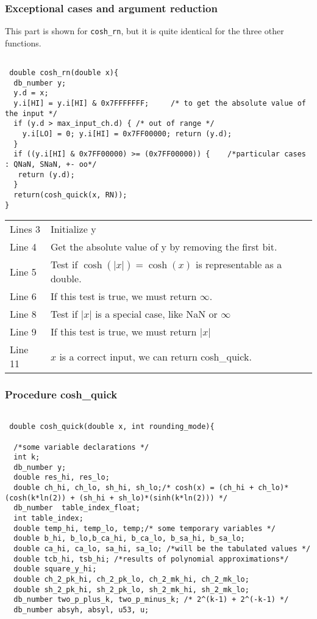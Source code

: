 \subsubsection{Exceptional cases and argument reduction}

This part  is shown for \texttt{cosh\_rn}, but it is quite identical for the three other functions.

\begin{lstlisting}[caption={Exceptional cases},firstnumber=1]

 double cosh_rn(double x){ 
  db_number y;
  y.d = x;
  y.i[HI] = y.i[HI] & 0x7FFFFFFF;     /* to get the absolute value of the input */
  if (y.d > max_input_ch.d) { /* out of range */
    y.i[LO] = 0; y.i[HI] = 0x7FF00000; return (y.d);
  }
  if ((y.i[HI] & 0x7FF00000) >= (0x7FF00000)) {    /*particular cases : QNaN, SNaN, +- oo*/
   return (y.d);
  }
  return(cosh_quick(x, RN));
}
\end{lstlisting}

\begin{tabular}{ll}
Lines  3 &  Initialize y\\
Line 4 & Get the absolute value of y by removing the first bit.\\
Line 5 & Test if $\cosh(|x|) = \cosh(x)$ is representable as a double.\\
Line 6 & If this test is true, we must return $\infty$.\\
Line 8 & Test if $|x|$ is a special case, like NaN or $\infty$\\
Line 9 & If this test is true, we must return $|x|$ \\
Line 11 & $x$ is a correct input, we can return cosh\_quick. \\
\end{tabular}



\subsubsection{Procedure cosh\_quick}

\begin{lstlisting}[caption={Procedure \texttt{cosh\_quick} - variables},firstnumber=1]

 double cosh_quick(double x, int rounding_mode){

  /*some variable declarations */
  int k;
  db_number y;
  double res_hi, res_lo;
  double ch_hi, ch_lo, sh_hi, sh_lo;/* cosh(x) = (ch_hi + ch_lo)*(cosh(k*ln(2)) + (sh_hi + sh_lo)*(sinh(k*ln(2))) */
  db_number  table_index_float;
  int table_index;
  double temp_hi, temp_lo, temp;/* some temporary variables */
  double b_hi, b_lo,b_ca_hi, b_ca_lo, b_sa_hi, b_sa_lo;
  double ca_hi, ca_lo, sa_hi, sa_lo; /*will be the tabulated values */
  double tcb_hi, tsb_hi; /*results of polynomial approximations*/
  double square_y_hi;
  double ch_2_pk_hi, ch_2_pk_lo, ch_2_mk_hi, ch_2_mk_lo;
  double sh_2_pk_hi, sh_2_pk_lo, sh_2_mk_hi, sh_2_mk_lo;
  db_number two_p_plus_k, two_p_minus_k; /* 2^(k-1) + 2^(-k-1) */
  db_number absyh, absyl, u53, u;

\end{lstlisting}


